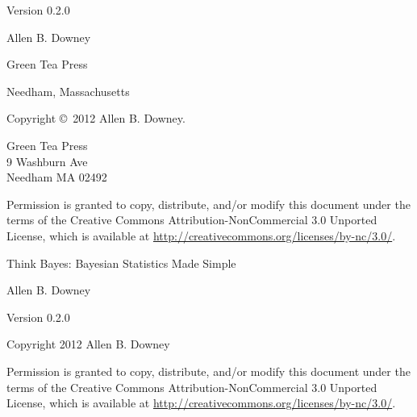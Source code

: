 \documentclass[12pt]{book}
\newcommand{\thetitle}{Think Bayes: Bayesian Statistics Made Simple}
\newcommand{\theversion}{0.2.0}
\begin{document}
\begin{latexonly}
\begin{flushright}
Version \theversion

\vspace{1in}


{\Large
Allen B. Downey\\
}


\vspace{0.5in}

{\Large Green Tea Press}

{\small Needham, Massachusetts}

\vfill

\end{flushright}


\pagebreak
\thispagestyle{empty}

Copyright \copyright ~2012 Allen B. Downey.


\vspace{0.2in}

\begin{flushleft}
Green Tea Press       \\
9 Washburn Ave \\
Needham MA 02492
\end{flushleft}

Permission is granted to copy, distribute, and/or modify this document
under the terms of the Creative Commons Attribution-NonCommercial 3.0 Unported
License, which is available at \url{http://creativecommons.org/licenses/by-nc/3.0/}.

\vspace{0.2in}

\end{latexonly}



\begin{htmlonly}


{\Large \thetitle}

{\large Allen B. Downey}

Version \theversion

\vspace{0.25in}

Copyright 2012 Allen B. Downey

\vspace{0.25in}

Permission is granted to copy, distribute, and/or modify this document
under the terms of the Creative Commons Attribution-NonCommercial 3.0
Unported License, which is available at
\url{http://creativecommons.org/licenses/by-nc/3.0/}.

\setcounter{chapter}{-1}

\end{htmlonly}
\end{document}
